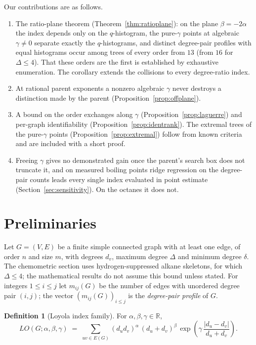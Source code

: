 \documentclass[a5paper, 10pt]{article}
\theoremstyle{plain}
\theoremstyle{remark}
\theoremstyle{definition}
\newtheorem{definition}{Definition}
\newcommand{\Wuzi}{LO(G;\alpha,\beta,\gamma)}
\begin{document}
  Our contributions are as follows.
  \begin{enumerate}
  \item[(i)] The ratio-plane theorem (Theorem~\ref{thm:ratioplane}):
  on the plane $\beta = -2\alpha$ the index depends only on the
  $q$-histogram, the pure-$\gamma$ points at algebraic $\gamma \neq 0$
  separate exactly the $q$-histograms, and distinct degree-pair profiles
  with equal histograms occur among trees of every order from $13$
  (from $16$ for $\Delta \le 4$). That these orders are the first is
  established by exhaustive enumeration. The corollary extends the
  collisions to every degree-ratio index.
  \item[(ii)] At rational parent exponents a nonzero algebraic $\gamma$
  never destroys a distinction made by the parent
  (Proposition~\ref{prop:offplane}).
  \item[(iii)] A bound on the order exchanges along $\gamma$
  (Proposition~\ref{prop:laguerre}) and per-graph identifiability
  (Proposition~\ref{prop:identrank}). The extremal trees of the
  pure-$\gamma$ points (Proposition~\ref{prop:extremal}) follow from
  known criteria and are included with a short proof.
  \item[(iv)] Freeing $\gamma$ gives no demonstrated gain once the
  parent's search box does not truncate it, and on measured boiling points
  ridge regression on the degree-pair counts leads every single index
  evaluated in point estimate (Section~\ref{sec:sensitivity}). On the octanes it does not.
  \end{enumerate}

\section{Preliminaries}\label{sec:prelim}

Let $G = (V, E)$ be a finite simple connected graph with at least one
edge, of order $n$ and size $m$, with degrees $d_v$, maximum degree
$\Delta$ and minimum degree $\delta$. The chemometric section uses
hydrogen-suppressed alkane skeletons, for which $\Delta \le 4$; the
mathematical results do not assume this bound unless stated. For
integers $1 \le i \le j$ let $m_{ij}(G)$ be the number of edges with
unordered degree pair $(i,j)$; the vector $(m_{ij}(G))_{i \le j}$ is the
\emph{degree-pair profile} of $G$.

\begin{definition}[Loyola index family]\label{def:wuzi}
For $\alpha, \beta, \gamma \in \mathbb{R}$,
\begin{equation}\label{eq:wuzi}
\Wuzi
\;=\; \sum_{uv \in E(G)}
(d_u d_v)^{\alpha}\,(d_u + d_v)^{\beta}\,
\exp\!\left(\gamma\,\frac{|d_u - d_v|}{d_u + d_v}\right).
\end{equation}
\end{definition}
\end{document}
